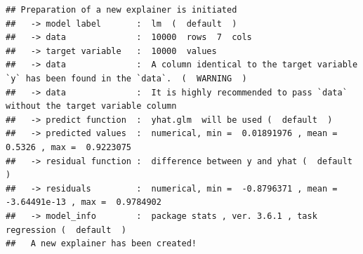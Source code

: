 \documentclass[12pt,]{krantz}
\newenvironment{Shaded}{\begin{snugshade}}{\end{snugshade}}
\newcommand{\DataTypeTok}[1]{\textcolor[rgb]{0.13,0.29,0.53}{#1}}
\newcommand{\DecValTok}[1]{\textcolor[rgb]{0.00,0.00,0.81}{#1}}
\newcommand{\KeywordTok}[1]{\textcolor[rgb]{0.13,0.29,0.53}{\textbf{#1}}}
\newcommand{\NormalTok}[1]{#1}
\newcommand{\OperatorTok}[1]{\textcolor[rgb]{0.81,0.36,0.00}{\textbf{#1}}}
\newcommand{\OtherTok}[1]{\textcolor[rgb]{0.56,0.35,0.01}{#1}}
\newcommand{\StringTok}[1]{\textcolor[rgb]{0.31,0.60,0.02}{#1}}
\begin{document}
\begin{Shaded}
\end{Shaded}

\begin{verbatim}
## Preparation of a new explainer is initiated
##   -> model label       :  lm  (  default  )
##   -> data              :  10000  rows  7  cols 
##   -> target variable   :  10000  values 
##   -> data              :  A column identical to the target variable `y` has been found in the `data`.  (  WARNING  )
##   -> data              :  It is highly recommended to pass `data` without the target variable column
##   -> predict function  :  yhat.glm  will be used (  default  )
##   -> predicted values  :  numerical, min =  0.01891976 , mean =  0.5326 , max =  0.9223075  
##   -> residual function :  difference between y and yhat (  default  )
##   -> residuals         :  numerical, min =  -0.8796371 , mean =  -3.64491e-13 , max =  0.9784902  
##   -> model_info        :  package stats , ver. 3.6.1 , task regression (  default  ) 
##   A new explainer has been created!
\end{verbatim}
\end{document}
